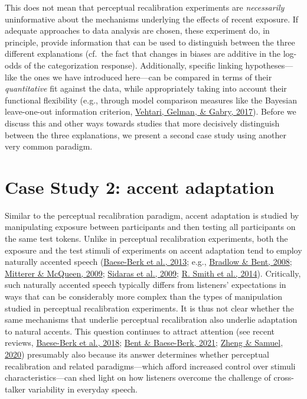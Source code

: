 \documentclass[
  11pt,
  english,
  man,floatsintext]{apa6}
\begin{document}
This does not mean that perceptual recalibration experiments are \emph{necessarily} uninformative about the mechanisms underlying the effects of recent exposure. If adequate approaches to data analysis are chosen, these experiment do, in principle, provide information that can be used to distinguish between the three different explanations (cf.~the fact that changes in biases are additive in the log-odds of the categorization response). Additionally, specific linking hypotheses---like the ones we have introduced here---can be compared in terms of their \emph{quantitative} fit against the data, while appropriately taking into account their functional flexibility (e.g., through model comparison measures like the Bayesian leave-one-out information criterion, \protect\hyperlink{ref-vehtari2017}{Vehtari, Gelman, \& Gabry, 2017}). Before we discuss this and other ways towards studies that more decisively distinguish between the three explanations, we present a second case study using another very common paradigm.

\hypertarget{case-study-2-accent-adaptation}{%
\section{Case Study 2: accent adaptation}\label{case-study-2-accent-adaptation}}

Similar to the perceptual recalibration paradigm, accent adaptation is studied by manipulating exposure between participants and then testing all participants on the same test tokens. Unlike in perceptual recalibration experiments, both the exposure and the test stimuli of experiments on accent adaptation tend to employ naturally accented speech (\protect\hyperlink{ref-baeseberk2013}{Baese-Berk et al., 2013}; e.g., \protect\hyperlink{ref-bradlow-bent2008}{Bradlow \& Bent, 2008}; \protect\hyperlink{ref-mitterer-mcqueen2009}{Mitterer \& McQueen, 2009}; \protect\hyperlink{ref-sidaras2009}{Sidaras et al., 2009}; \protect\hyperlink{ref-smith2014}{R. Smith et al., 2014}). Critically, such naturally accented speech typically differs from listeners' expectations in ways that can be considerably more complex than the types of manipulation studied in perceptual recalibration experiments. It is thus not clear whether the same mechanisms that underlie perceptual recalibration also underlie adaptation to natural accents. This question continues to attract attention (see recent reviews, \protect\hyperlink{ref-baeseberk2018}{Baese-Berk et al., 2018}; \protect\hyperlink{ref-bent-baeseberk2021}{Bent \& Baese-Berk, 2021}; \protect\hyperlink{ref-zheng-samuel2020}{Zheng \& Samuel, 2020}) presumably also because its answer determines whether perceptual recalibration and related paradigms---which afford increased control over stimuli characteristics---can shed light on how listeners overcome the challenge of cross-talker variability in everyday speech.
\end{document}
